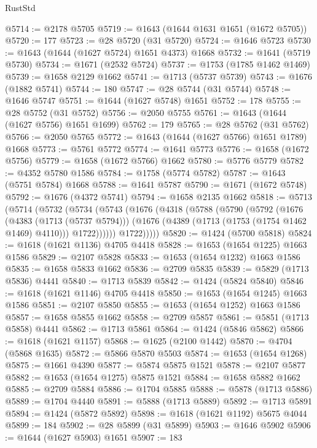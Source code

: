 \begin{lexlean}{RustStd}
\begin{coremodule}
@5714 := @2178 @5705
@5719 := @1643 (@1644 @1631 @1651 (@1672 @5705))
@5720 := 177
@5723 := @28 @5720 (@31 @5720)
@5724 := @1646 @5723
@5730 := @1643 (@1644 (@1627 @5724) @1651 @4373) @1668
@5732 := @1641 (@5719 @5730)
@5734 := @1671 (@2532 @5724)
@5737 := @1753 (@1785 @1462 @1469)
@5739 := @1658 @2129 @1662
@5741 := @1713 (@5737 @5739)
@5743 := @1676 (@1882 @5741)
@5744 := 180
@5747 := @28 @5744 (@31 @5744)
@5748 := @1646 @5747
@5751 := @1644 (@1627 @5748) @1651
@5752 := 178
@5755 := @28 @5752 (@31 @5752)
@5756 := @2050 @5755
@5761 := @1643 (@1644 (@1627 @5756) @1651 @1699)
@5762 := 179
@5765 := @28 @5762 (@31 @5762)
@5766 := @2050 @5765
@5772 := @1643 (@1644 (@1627 @5766) @1651 @1789) @1668
@5773 := @5761 @5772
@5774 := @1641 @5773
@5776 := @1658 (@1672 @5756)
@5779 := @1658 (@1672 @5766) @1662
@5780 := @5776 @5779
@5782 := @4352 @5780 @1586
@5784 := @1758 (@5774 @5782)
@5787 := @1643 (@5751 @5784) @1668
@5788 := @1641 @5787
@5790 := @1671 (@1672 @5748)
@5792 := @1676 (@4372 @5741)
@5794 := @1658 @2135 @1662
@5818 := @5713
    (@5714
      (@5732
        (@5734
          (@5743
            (@1676
              (@4318
                (@5788
                  (@5790
                    (@5792
                      (@1676
                        (@4383 (@1713 (@5737 @5794)))
                        (@1676 (@4389 (@1713 (@1753 (@1754 @1462 @1469) @4110))) @1722))))))
              @1722)))))
@5820 := @1424 (@5700 @5818)
@5824 := @1618 (@1621 @1136) @4705 @4418
@5828 := @1653 (@1654 @1225) @1663 @1586
@5829 := @2107 @5828
@5833 := @1653 (@1654 @1232) @1663 @1586
@5835 := @1658 @5833 @1662
@5836 := @2709 @5835
@5839 := @5829 (@1713 @5836) @4441
@5840 := @1713 @5839
@5842 := @1424 (@5824 @5840)
@5846 := @1618 (@1621 @1146) @4705 @4418
@5850 := @1653 (@1654 @1245) @1663 @1586
@5851 := @2107 @5850
@5855 := @1653 (@1654 @1252) @1663 @1586
@5857 := @1658 @5855 @1662
@5858 := @2709 @5857
@5861 := @5851 (@1713 @5858) @4441
@5862 := @1713 @5861
@5864 := @1424 (@5846 @5862)
@5866 := @1618 (@1621 @1157)
@5868 := @1625 (@2100 @1442)
@5870 := @4704 (@5868 @1635)
@5872 := @5866 @5870 @5503
@5874 := @1653 (@1654 @1268)
@5875 := @1661 @4390
@5877 := @5874 @5875 @1521
@5878 := @2107 @5877
@5882 := @1653 (@1654 @1275) @5875 @1521
@5884 := @1658 @5882 @1662
@5885 := @2709 @5884
@5886 := @1704 @5885
@5888 := @5878 (@1713 @5886)
@5889 := @1704 @4440
@5891 := @5888 (@1713 @5889)
@5892 := @1713 @5891
@5894 := @1424 (@5872 @5892)
@5898 := @1618 (@1621 @1192) @5675 @4044
@5899 := 184
@5902 := @28 @5899 (@31 @5899)
@5903 := @1646 @5902
@5906 := @1644 (@1627 @5903) @1651
@5907 := 183

\end{coremodule}
\end{lexlean}

